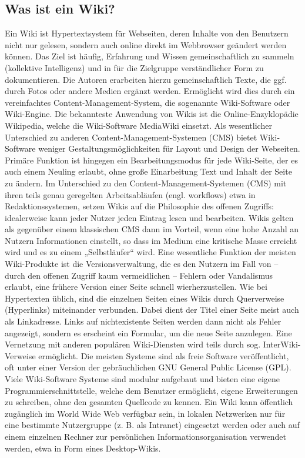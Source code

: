 \subsection{Was ist ein Wiki?}
Ein Wiki ist Hypertextsystem für Webseiten, deren Inhalte von den Benutzern nicht nur gelesen, sondern auch online direkt im Webbrowser geändert werden können. Das Ziel ist häufig, Erfahrung und Wissen gemeinschaftlich zu sammeln (kollektive Intelligenz) und in für die Zielgruppe verständlicher Form zu dokumentieren. Die Autoren erarbeiten hierzu gemeinschaftlich Texte, die ggf. durch Fotos oder andere Medien ergänzt werden. Ermöglicht wird dies durch ein vereinfachtes Content-Management-System, die sogenannte Wiki-Software oder Wiki-Engine. Die bekannteste Anwendung von Wikis ist die Online-Enzyklopädie Wikipedia, welche die Wiki-Software MediaWiki einsetzt. Als wesentlicher Unterschied zu anderen Content-Management-Systemen (CMS) bietet Wiki-Software weniger Gestaltungsmöglichkeiten für Layout und Design der Webseiten. Primäre Funktion ist hingegen ein Bearbeitungsmodus für jede Wiki-Seite, der es auch einem Neuling erlaubt, ohne große Einarbeitung Text und Inhalt der Seite zu ändern. Im Unterschied zu den Content-Management-Systemen (CMS) mit ihren teils genau geregelten Arbeitsabläufen (engl. workflows) etwa in Redaktionssystemen, setzen Wikis auf die Philosophie des offenen Zugriffs: idealerweise kann jeder Nutzer jeden Eintrag lesen und bearbeiten. Wikis gelten als gegenüber einem klassischen CMS dann im Vorteil, wenn eine hohe Anzahl an Nutzern Informationen einstellt, so dass im Medium eine kritische Masse erreicht wird und es zu einem „Selbstläufer“ wird. Eine wesentliche Funktion der meisten Wiki-Produkte ist die Versionsverwaltung, die es den Nutzern im Fall von – durch den offenen Zugriff kaum vermeidlichen – Fehlern oder Vandalismus erlaubt, eine frühere Version einer Seite schnell wierherzustellen. Wie bei Hypertexten üblich, sind die einzelnen Seiten eines Wikis durch Querverweise (Hyperlinks) miteinander verbunden. Dabei dient der Titel einer Seite meist auch als Linkadresse. Links auf nichtexistente Seiten werden dann nicht als Fehler angezeigt, sondern es erscheint ein Formular, um die neue Seite anzulegen. Eine Vernetzung mit anderen populären Wiki-Diensten wird teils durch sog. InterWiki-Verweise ermöglicht. Die meisten Systeme sind als freie Software veröffentlicht, oft unter einer Version der gebräuchlichen GNU General Public License (GPL). Viele Wiki-Software Systeme sind modular aufgebaut und bieten eine eigene Programmierschnittstelle, welche dem Benutzer ermöglicht, eigene Erweiterungen zu schreiben, ohne den gesamten Quellcode zu kennen. Ein Wiki kann öffentlich zugänglich im World Wide Web verfügbar sein, in lokalen Netzwerken nur für eine bestimmte Nutzergruppe (z. B. als Intranet) eingesetzt werden oder auch auf einem einzelnen Rechner zur persönlichen Informationsorganisation verwendet werden, etwa in Form eines Desktop-Wikis. 
